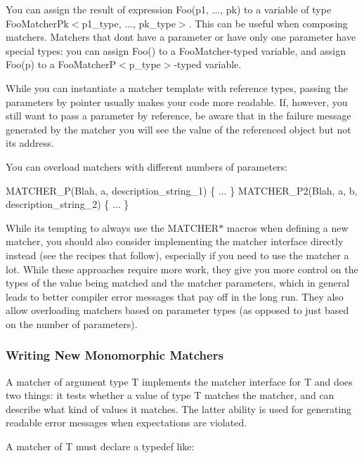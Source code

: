 You can assign the result of expression {\ttfamily Foo(p1, ..., pk)} to a variable of type {\ttfamily Foo\+Matcher\+Pk$<$p1\+\_\+type, ..., pk\+\_\+type$>$}. This can be useful when composing matchers. Matchers that don\textquotesingle{}t have a parameter or have only one parameter have special types\+: you can assign {\ttfamily Foo()} to a {\ttfamily Foo\+Matcher}-\/typed variable, and assign {\ttfamily Foo(p)} to a {\ttfamily Foo\+MatcherP$<$p\+\_\+type$>$}-\/typed variable.

While you can instantiate a matcher template with reference types, passing the parameters by pointer usually makes your code more readable. If, however, you still want to pass a parameter by reference, be aware that in the failure message generated by the matcher you will see the value of the referenced object but not its address.

You can overload matchers with different numbers of parameters\+:


\begin{DoxyCode}
MATCHER\_P(Blah, a, description\_string\_1) \{ ... \}
MATCHER\_P2(Blah, a, b, description\_string\_2) \{ ... \}
\end{DoxyCode}


While it\textquotesingle{}s tempting to always use the {\ttfamily M\+A\+T\+C\+H\+E\+R$\ast$} macros when defining a new matcher, you should also consider implementing the matcher interface directly instead (see the recipes that follow), especially if you need to use the matcher a lot. While these approaches require more work, they give you more control on the types of the value being matched and the matcher parameters, which in general leads to better compiler error messages that pay off in the long run. They also allow overloading matchers based on parameter types (as opposed to just based on the number of parameters).

\subsubsection*{Writing New Monomorphic Matchers}

A matcher of argument type {\ttfamily T} implements the matcher interface for {\ttfamily T} and does two things\+: it tests whether a value of type {\ttfamily T} matches the matcher, and can describe what kind of values it matches. The latter ability is used for generating readable error messages when expectations are violated.

A matcher of {\ttfamily T} must declare a typedef like\+:



